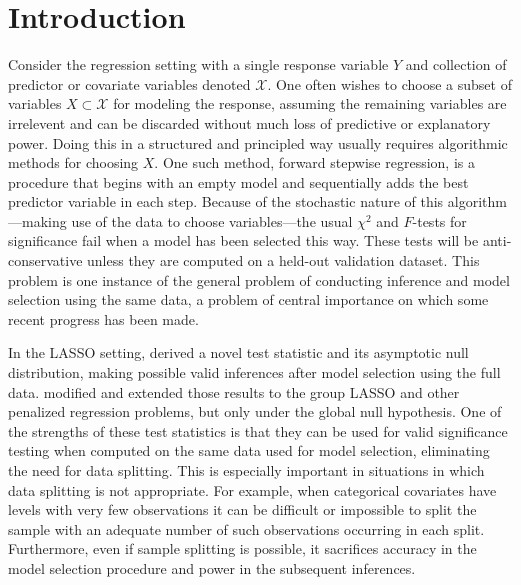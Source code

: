 \documentclass{imsart}
\begin{document}
\begin{frontmatter}
\begin{keyword}[class=AMS]
\end{keyword}

\begin{keyword}
\end{keyword}

\end{frontmatter}


\section{Introduction}
\label{sec:intro}

Consider the regression setting with a single response variable $Y$
and collection of predictor or covariate variables denoted $\mathcal X$.
One often wishes to choose a subset of variables $X \subset \mathcal X$
for modeling the response, assuming the remaining variables are
irrelevent and can be discarded without much loss of predictive
or explanatory power. Doing this in a structured and principled way
usually requires algorithmic methods for choosing $X$. One such method,
forward stepwise regression, is a procedure
that begins with an empty model and sequentially adds the best predictor
variable in each step. Because of the stochastic nature of this
algorithm---making use of the data to choose variables---the
usual $\chi^2$ and $F$-tests for significance
fail when a model has been selected this way. These tests will be
anti-conservative unless they are computed on a held-out validation
dataset. This problem is one instance of the general problem of
conducting inference and model selection using the same data, a problem
of central importance on which some recent progress has been made.

In the LASSO setting, \cite{significance:lasso} derived
a novel test statistic and its asymptotic null distribution, making
possible valid inferences after model selection using the full data.
\cite{tests:adaptive} modified and extended those results to the
group LASSO \citep{grouplasso} and other penalized regression
problems, but only under the global null hypothesis.
One of the strengths of these test statistics is that they can be
used for valid significance testing when computed on the same
data used for model selection, eliminating the need for data splitting.
This is especially important in
situations in which data splitting is not appropriate. For example,
when categorical covariates have levels with very few observations
it can be difficult or impossible to split the sample with an adequate
number of such observations occurring in each split. Furthermore, even
if sample splitting is possible, it sacrifices accuracy in the model
selection procedure and power in the subsequent inferences. 
\end{document}
